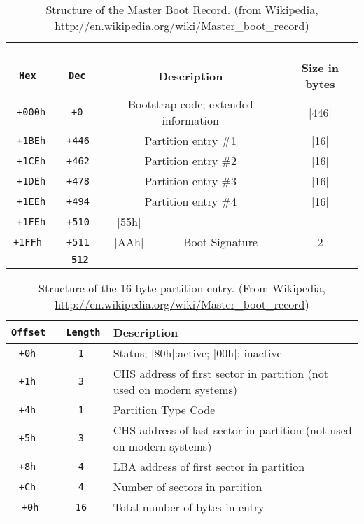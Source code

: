 \begin{table}
\begin{minipage}{\textwidth}
\caption{Structure of the Master Boot Record. ({\small from Wikipedia, \url{http://en.wikipedia.org/wiki/Master_boot_record}})}\label{mbr}
\begin{tabular}{|>{\tt}c|>{\tt}c|c|c|c|}
\hline
\multicolumn{2}{|c|}{\bf Address} & \multicolumn{2}{c|}{}                              & \\
\cline{1-2} \bf Hex & \bf Dec         & \multicolumn{2}{c|}{\multirow{-2}{*}{\bf Description}} & \multirow{-2}{*}{\bf Size in bytes}\\
\hline
+000h & +0   & \multicolumn{2}{c|}{Bootstrap code; extended information} & |446| \\
\hline
\hline
+1BEh & +446 & \multicolumn{2}{c|}{Partition entry \#1} & |16| \\
\hline
+1CEh & +462 & \multicolumn{2}{c|}{Partition entry \#2} & |16| \\
\hline
+1DEh & +478 & \multicolumn{2}{c|}{Partition entry \#3} & |16| \\
\hline
+1EEh & +494 & \multicolumn{2}{c|}{Partition entry \#4} & |16| \\
\hline
+1FEh & +510 & |55h| & & \\
\cline{1-3}
+1FFh & +511 & |AAh| & \multirow{-2}{*}{Boot Signature} & \multirow{-2}{*}{2} \\
\hline
\hline
\multicolumn{4}{|r|}{\textbf{Total size: $\bf 446 + (4\times16) + 2 $}} & \textbf{512}\\
\hline
\end{tabular}
\end{minipage}
\end{table}


\begin{table}
\caption{Structure of the 16-byte partition
  entry. {\small(From Wikipedia, \url{http://en.wikipedia.org/wiki/Master_boot_record})}}\label{mbr:partition}
\begin{tabular}{|>{\tt}c|>{\tt}c|l|}
\hline
\textrm{Offset} & \textrm{Length} & Description \\
\hline
+0h & 1 & Status; |80h|:active; |00h|: inactive \\
+1h & 3 & CHS address of first sector in partition (not used on modern systems) \\
+4h & 1 & Partition Type Code \\
+5h & 3 & CHS address of last sector in partition (not used on modern systems)\\
+8h & 4 & LBA address of first sector in partition \\
+Ch & 4 & Number of sectors in partition \\
\hline
+0h & 16 & Total number of bytes in entry \\
\hline
\hline
\end{tabular}
\end{table}

